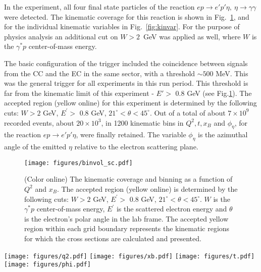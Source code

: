 \documentclass[prc,aps,floatfix,showpacs,showkeys,twocolumn,superscriptaddress,letterpaper,10pt]{revtex4-1}
\begin{document}
In the experiment, all four final state particles of the reaction $ep \to e' p' \eta,\  \eta \to \gamma\gamma$ were detected. 
The kinematic coverage for this reaction is shown in Fig.~\ref{fig:kin_cuts},  
and for the individual kinematic variables in Fig.~\ref{fig:kinvar}. For the purpose of physics analysis an additional cut on  $W>2$~GeV was applied as well, where $W$ is the $\gamma^*p$ center-of-mass energy.


The basic configuration of the trigger included the coincidence between signals from   the CC and the EC  in the same sector, with a threshold $\sim 500$ MeV. This was the general trigger for all experiments in this run period.   This threshold  is far  from the kinematic limit of this experiment - $E'>$ 0.8 GeV (see Fig.\ref{fig:kin_cuts}). The accepted region (yellow online) for this experiment is determined by the following cuts: 
$W>2$ GeV, $E^\prime>$ 0.8 GeV, $21^\circ<\theta<45^\circ$. 
Out of a total of about $7 \times 10^9$  recorded  events, about  $20\times10^3$, in 1200 kinematic bins in $Q^2, t, x_B$ and $\phi_\eta$,  for the reaction $ep \to e' p' \eta$, were finally retained. 
The variable $\phi_\eta$ is the azimuthal angle of the emitted $\eta$ relative to the electron scattering plane.

\begin{figure}
\begin{center}
\texttt{[image: figures/binvol\_sc.pdf]}
\caption{(Color online) The kinematic coverage and binning as a function of $Q^2$ and $x_B$. 
The accepted region (yellow online) is determined by the following cuts: 
$W>2$ GeV, $E^\prime>$ 0.8 GeV, $21^\circ<\theta<45^\circ$.
$W$ is the $\gamma^*p$ center-of-mass energy, $E^\prime$ is the scattered electron energy  and $\theta$ is  the  electron's polar angle in the lab frame. The accepted yellow region within each grid boundary represents the kinematic regions for which the cross sections are calculated and presented.} 
\label{fig:kin_cuts}
\end{center}
\end{figure}

\begin{figure*}
\centering
\texttt{[image: figures/q2.pdf]}
\texttt{[image: figures/xb.pdf]}
\texttt{[image: figures/t.pdf]}
\texttt{[image: figures/phi.pdf]}
\caption{(Color online) Yield distributions for kinematic variables $Q^2$, $x_B$, $-t$ and $\phi_\eta$ in arbitrary units. 
The data are in black (solid) and the results of Monte Carlo simulations are in red (dotted). The areas under the curves are normalized to each other. The curves for both the data and Monte Carlo simulations  are the final distributions obtained after tracking and include acceptances and efficiencies. }
\label{fig:kinvar}
\end{figure*}
\end{document}

